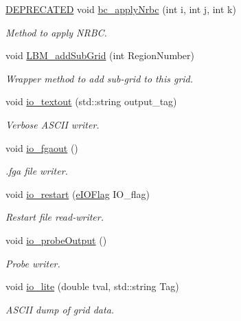\begin{DoxyCompactItemize}
\hyperlink{stdafx_8h_ac1e8a42306d8e67cb94ca31c3956ee78}{D\+E\+P\+R\+E\+C\+A\+T\+ED} void \hyperlink{class_grid_obj_ae4fd999e7334c8ec8e1118c92e0c7338}{bc\+\_\+apply\+Nrbc} (int i, int j, int k)
\begin{DoxyCompactList}\small\item\em Method to apply N\+R\+BC. \end{DoxyCompactList}\item 
void \hyperlink{class_grid_obj_ab0d47be7ccafaa84b5d43da69e2082b9}{L\+B\+M\+\_\+add\+Sub\+Grid} (int Region\+Number)
\begin{DoxyCompactList}\small\item\em Wrapper method to add sub-\/grid to this grid. \end{DoxyCompactList}\item 
void \hyperlink{class_grid_obj_a1f334215b7789ea1ad8e2d1e15c67fb2}{io\+\_\+textout} (std\+::string output\+\_\+tag)
\begin{DoxyCompactList}\small\item\em Verbose A\+S\+C\+II writer. \end{DoxyCompactList}\item 
void \hyperlink{class_grid_obj_aa80aecb06d7a420865c32b8acc15581e}{io\+\_\+fgaout} ()
\begin{DoxyCompactList}\small\item\em .fga file writer. \end{DoxyCompactList}\item 
void \hyperlink{class_grid_obj_a94551d2e383da4b2a2c930488d436a42}{io\+\_\+restart} (\hyperlink{_grid_obj_8h_ad1926c22ad82853adff44c4b76b97827}{e\+I\+O\+Flag} I\+O\+\_\+flag)
\begin{DoxyCompactList}\small\item\em Restart file read-\/writer. \end{DoxyCompactList}\item 
void \hyperlink{class_grid_obj_af7e8782f95d15884d761cc4f1d5926c0}{io\+\_\+probe\+Output} ()
\begin{DoxyCompactList}\small\item\em Probe writer. \end{DoxyCompactList}\item 
void \hyperlink{class_grid_obj_acf311bbf350fd48104663eaabebca835}{io\+\_\+lite} (double tval, std\+::string Tag)
\begin{DoxyCompactList}\small\item\em A\+S\+C\+II dump of grid data. \end{DoxyCompactList}\item 

\end{DoxyCompactItemize}
